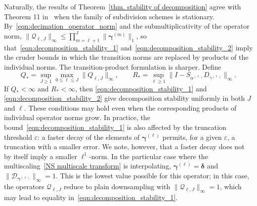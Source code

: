 \documentclass[11pt,a4paper]{article}
\theoremstyle{definition}
\begin{document}
Naturally, the results of Theorem~\ref{thm. stability of decomposition} agree with Theorem 11 in~\cite{dyn2021linear} when the family of subdivision schemes is stationary. By~\eqref{eqn:decimation_operator_norm} and the submultiplicativity of the operator norm, $\|\mathcal{Q}_{\ell,J}\|_\infty\leq\prod_{m=\ell+1}^{J}\|\boldsymbol{\gamma}^{(m)}\|_1$, so that~\eqref{eqn:decomposition_stability_1} and~\eqref{eqn:decomposition_stability_2} imply the cruder bounds in which the transition norms are replaced by products of the individual norms. The transition-product formulation is sharper. Define
$$ Q_*=\sup_{J\ge1}\max_{0\le\ell\le J}\|Q_{\ell,J}\|_\infty, \qquad R_*=\sup_{\ell\ge1} \|I-S_{\alpha^{(\ell)}}D_{\gamma^{(\ell)}}\|_\infty. $$
If \(Q_*<\infty\) and \(R_*<\infty\), then \eqref{eqn:decomposition_stability_1} and \eqref{eqn:decomposition_stability_2} give decomposition stability uniformly in both \(J\) and \(\ell\). These conditions may hold even when the corresponding products of individual operator norms grow. In practice, the bound~\eqref{eqn:decomposition_stability_1} is also affected by the truncation threshold $\varepsilon$: a faster decay of the elements of $\boldsymbol{\gamma}^{(\ell)}$ permits, for a given $\varepsilon$, a truncation with a smaller error. We note, however, that a faster decay does not by itself imply a smaller $\ell^1$-norm. In the particular case where the multiscaling~\eqref{NS multiscale transform} is interpolating, $\boldsymbol{\gamma}^{(\ell)}=\boldsymbol{\delta}$ and $\|\mathcal{D}_{\boldsymbol{\gamma}^{(\ell)}}\|_\infty=1$. This is the lowest value possible for this operator; in this case, the operators $\mathcal{Q}_{\ell,J}$ reduce to plain downsampling with $\|\mathcal{Q}_{\ell,J}\|_\infty=1$, which may lead to equality in~\eqref{eqn:decomposition_stability_1}.
\end{document}
